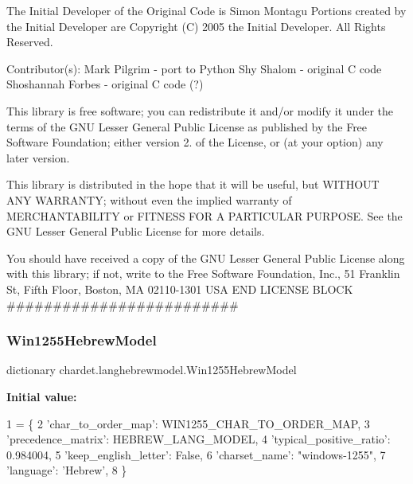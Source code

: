 The Initial Developer of the Original Code is Simon Montagu Portions created by the Initial Developer are Copyright (C) 2005 the Initial Developer. All Rights Reserved.

Contributor(s)\+: Mark Pilgrim -\/ port to Python Shy Shalom -\/ original C code Shoshannah Forbes -\/ original C code (?)

This library is free software; you can redistribute it and/or modify it under the terms of the G\+NU Lesser General Public License as published by the Free Software Foundation; either version 2. of the License, or (at your option) any later version.

This library is distributed in the hope that it will be useful, but W\+I\+T\+H\+O\+UT A\+NY W\+A\+R\+R\+A\+N\+TY; without even the implied warranty of M\+E\+R\+C\+H\+A\+N\+T\+A\+B\+I\+L\+I\+TY or F\+I\+T\+N\+E\+SS F\+OR A P\+A\+R\+T\+I\+C\+U\+L\+AR P\+U\+R\+P\+O\+SE. See the G\+NU Lesser General Public License for more details.

You should have received a copy of the G\+NU Lesser General Public License along with this library; if not, write to the Free Software Foundation, Inc., 51 Franklin St, Fifth Floor, Boston, MA 02110-\/1301 U\+SA E\+ND L\+I\+C\+E\+N\+SE B\+L\+O\+CK \#\#\#\#\#\#\#\#\#\#\#\#\#\#\#\#\#\#\#\#\#\#\#\#\# \mbox{\label{namespacechardet_1_1langhebrewmodel_a3bae8f37774840ed77062f4578fb66b5}} 
\subsubsection{\texorpdfstring{Win1255\+Hebrew\+Model}{Win1255HebrewModel}}
{\footnotesize\ttfamily dictionary chardet.\+langhebrewmodel.\+Win1255\+Hebrew\+Model}

{\bfseries Initial value\+:}
\begin{DoxyCode}
1 =  \{
2   \textcolor{stringliteral}{'char\_to\_order\_map'}: WIN1255\_CHAR\_TO\_ORDER\_MAP,
3   \textcolor{stringliteral}{'precedence\_matrix'}: HEBREW\_LANG\_MODEL,
4   \textcolor{stringliteral}{'typical\_positive\_ratio'}: 0.984004,
5   \textcolor{stringliteral}{'keep\_english\_letter'}: \textcolor{keyword}{False},
6   \textcolor{stringliteral}{'charset\_name'}: \textcolor{stringliteral}{"windows-1255"},
7   \textcolor{stringliteral}{'language'}: \textcolor{stringliteral}{'Hebrew'},
8 \}
\end{DoxyCode}
